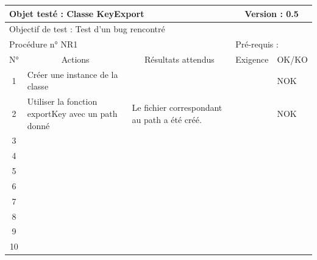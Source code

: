\documentclass{../res/univ-projet}
\begin{document}
\begin{center}
    \begin{tabular}{|c|p{5cm}|p{5cm}|p{1.5cm}|p{1.5cm}|}
      \hline
      \multicolumn{3}{|l|}{Objet testé : Classe KeyExport} & \multicolumn{2}{c|}{Version : 0.5}\\ \hline
      \multicolumn{5}{|l|}{Objectif de test : Test d'un bug rencontré}\\ \hline
      \multicolumn{3}{|l|}{Procédure n° NR1} & \multicolumn{2}{p{3cm}|}{Pré-requis : }\\ \hline
      \multicolumn{1}{|c|}{N°} & \multicolumn{1}{c|}{Actions} & \multicolumn{1}{c|}{Résultats attendus} & 
      \multicolumn{1}{c|}{Exigence} & \multicolumn{1}{c|}{OK/KO}\\ \hline
      1 & Créer une instance de la classe &  &  & NOK \\
      2 & Utiliser la fonction exportKey avec un path donné & Le fichier correspondant au path a été créé. &  & NOK \\
      3 &  &  &  & \\
      4 &  &  &  & \\
      5 &  &  &  & \\
	    6 &  &  &  & \\
      7 &  &  &  & \\
      8 &  &  &  & \\
      9 &  &  &  & \\
      10 &  &  &  &\\ 
	\hline
    \end{tabular}
    \vskip 2.2cm


\end{center}
\end{document}
